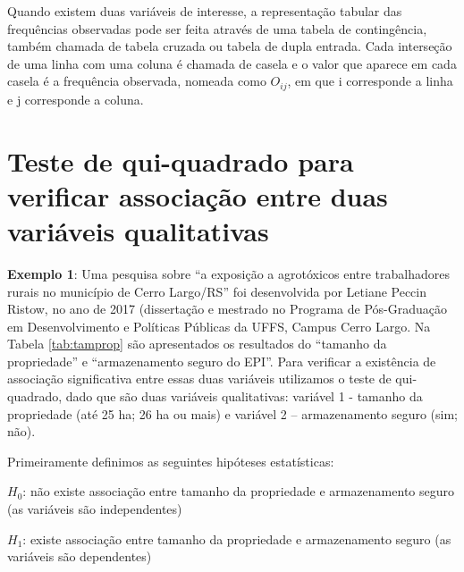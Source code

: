 \documentclass[12pt,brazil,oneside]{book}
\begin{document}
\begin{flushright}
\emph{}
\end{flushright}

Quando existem duas variáveis de interesse, a representação tabular das frequências observadas pode ser feita através de uma tabela de contingência, também chamada de tabela cruzada ou tabela de dupla entrada. Cada interseção de uma linha com uma coluna é chamada de casela e o valor que aparece em cada casela é a frequência observada, nomeada como \(O_{ij}\), em que i corresponde a linha e j corresponde a coluna.

\hypertarget{teste-de-qui-quadrado-para-verificar-associacao-entre-duas-variaveis-qualitativas}{%
\section{Teste de qui-quadrado para verificar associação entre duas variáveis qualitativas}\label{teste-de-qui-quadrado-para-verificar-associacao-entre-duas-variaveis-qualitativas}}

\textbf{Exemplo 1}: Uma pesquisa sobre ``a exposição a agrotóxicos entre trabalhadores rurais no município de Cerro Largo/RS'' foi desenvolvida por Letiane Peccin Ristow, no ano de 2017 (dissertação e mestrado no Programa de Pós-Graduação em Desenvolvimento e Políticas Públicas da UFFS, Campus Cerro Largo. Na Tabela \ref{tab:tamprop} são apresentados os resultados do ``tamanho da propriedade'' e ``armazenamento seguro do EPI''. Para verificar a existência de associação significativa entre essas duas variáveis utilizamos o teste de qui-quadrado, dado que são duas variáveis qualitativas: variável 1 - tamanho da propriedade (até 25 ha; 26 ha ou mais) e variável 2 -- armazenamento seguro (sim; não).

Primeiramente definimos as seguintes hipóteses estatísticas:

\(H_0\): não existe associação entre tamanho da propriedade e armazenamento seguro (as variáveis são independentes)

\(H_1\): existe associação entre tamanho da propriedade e armazenamento seguro (as variáveis são dependentes)
\end{document}
